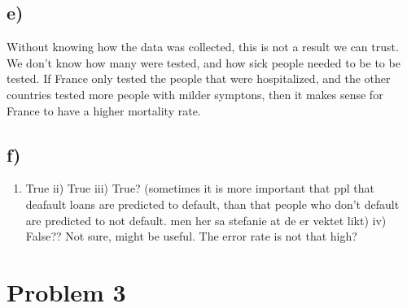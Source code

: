 \documentclass[
]{article}
\newenvironment{Shaded}{\begin{snugshade}}{\end{snugshade}}
\newcommand{\CommentTok}[1]{\textcolor[rgb]{0.56,0.35,0.01}{\textit{#1}}}
\newcommand{\DataTypeTok}[1]{\textcolor[rgb]{0.13,0.29,0.53}{#1}}
\newcommand{\DecValTok}[1]{\textcolor[rgb]{0.00,0.00,0.81}{#1}}
\newcommand{\KeywordTok}[1]{\textcolor[rgb]{0.13,0.29,0.53}{\textbf{#1}}}
\newcommand{\NormalTok}[1]{#1}
\newcommand{\OperatorTok}[1]{\textcolor[rgb]{0.81,0.36,0.00}{\textbf{#1}}}
\newcommand{\StringTok}[1]{\textcolor[rgb]{0.31,0.60,0.02}{#1}}
\providecommand{\tightlist}{%
  \setlength{\itemsep}{0pt}\setlength{\parskip}{0pt}}
\begin{document}
\hypertarget{e}{%
\subsection{e)}\label{e}}

Without knowing how the data was collected, this is not a result we can
trust. We don't know how many were tested, and how sick people needed to
be to be tested. If France only tested the people that were
hospitalized, and the other countries tested more people with milder
symptons, then it makes sense for France to have a higher mortality
rate.

\hypertarget{f}{%
\subsection{f)}\label{f}}

\begin{enumerate}
\def\labelenumi{\roman{enumi})}
\tightlist
\item
  True ii) True iii) True? (sometimes it is more important that ppl that
  deafault loans are predicted to default, than that people who don't
  default are predicted to not default. men her sa stefanie at de er
  vektet likt) iv) False?? Not sure, might be useful. The error rate is
  not that high?
\end{enumerate}

\hypertarget{problem-3}{%
\section{Problem 3}\label{problem-3}}

\begin{Shaded}
\end{Shaded}
\end{document}
